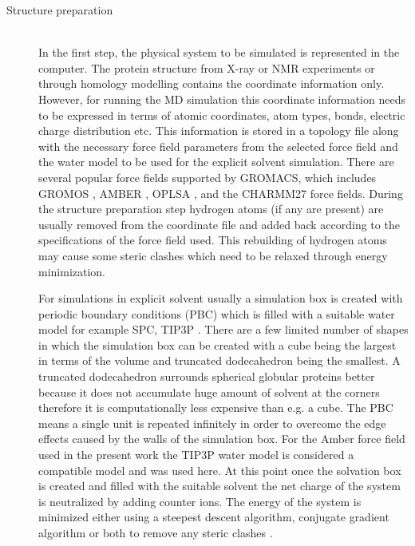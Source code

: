 		\begin{description}
		\item[Structure preparation] \hfill \\ In the first step, the physical system to be simulated is represented in the computer. The protein structure from X-ray or NMR experiments or through homology modelling contains the coordinate information only. However, for running the MD simulation this coordinate information needs to be expressed in terms of atomic coordinates, atom types, bonds, electric charge distribution etc. This information is stored in a topology file along with the necessary force field parameters from the selected force field and the water model to be used for the explicit solvent simulation. There are several popular force fields supported by GROMACS, which includes GROMOS \parencite{Oostenbrink2004}, AMBER \parencite{Lindorff-Larsen2010}, OPLSA \parencite{Jorgensen1996}, and the CHARMM27 \parencite{MacKerell1998} force fields. During the structure preparation step hydrogen atoms (if any are present) are usually removed from the coordinate file and added back according to the specifications of the force field used. This rebuilding of hydrogen atoms may cause some steric clashes which need to be relaxed through energy minimization. 
		
		For simulations in explicit solvent usually a simulation box is created with periodic boundary conditions (PBC) which is filled with a suitable water model for example SPC, TIP3P \parencite{Spoel1998}. There are a few limited number of shapes in which the simulation box can be created with a cube being the largest in terms of the volume and truncated dodecahedron being the smallest. A truncated dodecahedron surrounds spherical globular proteins better because it does not accumulate huge amount of solvent at the corners therefore it is computationally less expensive than e.g. a cube. The PBC means a single unit is repeated infinitely in order to overcome the edge effects caused by the walls of the simulation box. %
		For the Amber force field used in the present work the TIP3P water model is considered a compatible model and was used here. At this point once the solvation box is created and filled with the suitable solvent the net charge of the system is neutralized by adding counter ions. The energy of the system is minimized either using a steepest descent algorithm, conjugate gradient algorithm or both to remove any steric clashes \parencite{Hess2008a}.
					

\end{description}
